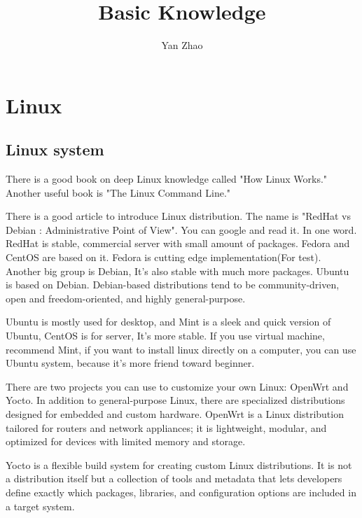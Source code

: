 \documentclass[paper=8.5in:11in, twoside, 12pt, pagesize=pdftex]{book}
\begin{document}
\title{Basic Knowledge}
\author{Yan Zhao}
\date{}\maketitle

\tableofcontents

\setcounter{page}{1}

\chapter{Linux}

\section{Linux system}

	\par There is a good book on deep Linux knowledge called "How Linux Works." Another useful book is "The Linux Command Line."

	\par There is a good article to introduce Linux distribution. The name is "RedHat vs Debian : Administrative Point of View". You can google and read it. In one word. RedHat is stable, commercial server with small amount of packages. Fedora and CentOS are based on it. Fedora is cutting edge implementation(For test). Another big group is Debian, It's also stable with much more packages. Ubuntu is based on Debian. Debian-based distributions tend to be community-driven, open and freedom-oriented, and highly general-purpose.

	\par Ubuntu is mostly used for desktop, and Mint is a sleek and quick version of Ubuntu, CentOS is for server, It's more stable. If you use virtual machine, recommend Mint, if you want to install linux directly on a computer, you can use Ubuntu system, because it's more friend toward beginner.

	
	\par There are two projects you can use to customize your own Linux: OpenWrt and Yocto. In addition to general-purpose Linux, there are specialized distributions designed for embedded and custom hardware. OpenWrt is a Linux distribution tailored for routers and network appliances; it is lightweight, modular, and optimized for devices with limited memory and storage.


	\par Yocto is a flexible build system for creating custom Linux distributions. It is not a distribution itself but a collection of tools and metadata that lets developers define exactly which packages, libraries, and configuration options are included in a target system.
\end{document}
